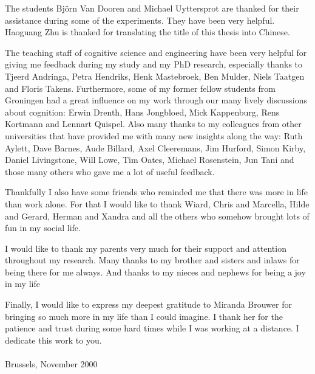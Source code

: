 The students Bj\"orn Van Dooren and Michael Uyttersprot are thanked for their assistance during some of the experiments. They have been very helpful. Haoguang Zhu is thanked for translating the title of this thesis into Chinese.

The teaching staff of cognitive science and engineering have been very helpful for giving me feedback during my study and my PhD research, especially thanks to Tjeerd Andringa, Petra Hendriks, Henk Mastebroek, Ben Mulder, Niels Taatgen and Floris Takens. Furthermore, some of my former fellow students from Groningen had a great influence on my work through our many lively discussions about cognition: Erwin Drenth, Hans Jongbloed, Mick Kappenburg, Rens Kortmann and Lennart Quispel. Also many thanks to my colleagues from other universities that have provided me with many new insights along the way: Ruth Aylett, Dave Barnes, Aude Billard, Axel Cleeremans, Jim Hurford, Simon Kirby, Daniel Livingstone, Will Lowe, Tim Oates, Michael Rosenstein, Jun Tani and those many others who gave me a lot of useful feedback.

Thankfully I also have some friends who reminded me that there was more in life than work alone. For that I would like to thank Wiard, Chris and Marcella, Hilde and Gerard, Herman and Xandra and all the others who somehow brought lots of fun in my social life.

I would like to thank my parents very much for their support and attention throughout my research. Many thanks to my brother and sisters and inlaws for being there for me always. And thanks to my nieces and nephews for being a joy in my life

Finally, I would like to express my deepest gratitude to Miranda Brouwer for bringing so much more in my life than I could imagine. I thank her for the patience and trust during some hard times while I was working at a distance. I dedicate this work to you.
\\
\\
\noindent Brussels, November 2000
